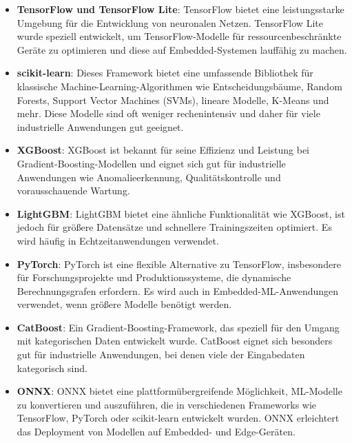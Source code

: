 \begin{itemize}
    \item \textbf{TensorFlow und TensorFlow Lite}: TensorFlow bietet eine leistungsstarke Umgebung für die Entwicklung von neuronalen Netzen. 
    TensorFlow Lite wurde speziell entwickelt, um TensorFlow-Modelle für ressourcenbeschränkte Geräte zu optimieren und diese auf Embedded-Systemen lauffähig zu machen.
    
    \item \textbf{scikit-learn}: Dieses Framework bietet eine umfassende Bibliothek für klassische Machine-Learning-Algorithmen wie 
    Entscheidungsbäume, Random Forests, Support Vector Machines (SVMs), lineare Modelle, K-Means und mehr. Diese Modelle sind oft weniger rechenintensiv 
    und daher für viele industrielle Anwendungen gut geeignet.

    \item \textbf{XGBoost}: XGBoost ist bekannt für seine Effizienz und Leistung bei Gradient-Boosting-Modellen und eignet sich gut für industrielle Anwendungen 
    wie Anomalieerkennung, Qualitätskontrolle und vorausschauende Wartung.

    \item \textbf{LightGBM}: LightGBM bietet eine ähnliche Funktionalität wie XGBoost, ist jedoch für größere Datensätze und schnellere Trainingszeiten optimiert. 
    Es wird häufig in Echtzeitanwendungen verwendet.

    \item \textbf{PyTorch}: PyTorch ist eine flexible Alternative zu TensorFlow, insbesondere für Forschungsprojekte und Produktionssysteme, 
    die dynamische Berechnungsgrafen erfordern. Es wird auch in Embedded-ML-Anwendungen verwendet, wenn größere Modelle benötigt werden.

    \item \textbf{CatBoost}: Ein Gradient-Boosting-Framework, das speziell für den Umgang mit kategorischen Daten entwickelt wurde. 
    CatBoost eignet sich besonders gut für industrielle Anwendungen, bei denen viele der Eingabedaten kategorisch sind.

    \item \textbf{ONNX}: ONNX bietet eine plattformübergreifende Möglichkeit, ML-Modelle zu konvertieren und auszuführen, die in verschiedenen Frameworks wie 
    TensorFlow, PyTorch oder scikit-learn entwickelt wurden. ONNX erleichtert das Deployment von Modellen auf Embedded- und Edge-Geräten.
\end{itemize}

